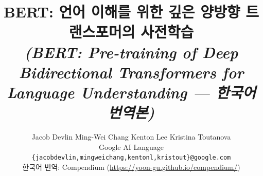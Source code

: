 \documentclass[11pt,a4paper]{article}
\title{\textbf{BERT}: 언어 이해를 위한 깊은 양방향 트랜스포머의 사전학습\\[2pt]\normalsize\normalfont\itshape (BERT: Pre-training of Deep Bidirectional Transformers for Language Understanding — 한국어 번역본)}
\author{Jacob Devlin \quad Ming-Wei Chang \quad Kenton Lee \quad Kristina Toutanova \\
  Google AI Language \\
  {\tt \{jacobdevlin,mingweichang,kentonl,kristout\}@google.com} \\[4pt]
  \normalfont\rmfamily 한국어 번역: Compendium (\url{https://yoon-gu.github.io/compendium/})}
\date{}
\begin{document}
\maketitle
\begin{abstract}
  
\end{abstract}
















{} 
\appendix                                     

\end{document}
